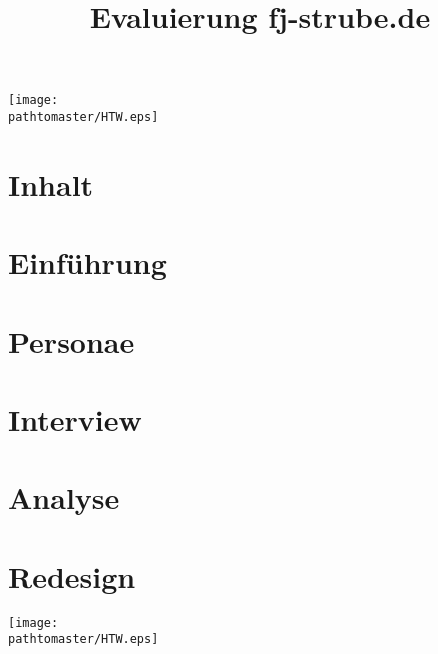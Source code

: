 \documentclass[11pt, 
]{beamer}
\author[]{Jan Brose\texorpdfstring{\strut\\}{, }
Simon Retsch\texorpdfstring{\strut\\}{, }
Ben Schönherr\texorpdfstring{\strut\\}{, }
Eric Schmidtgen\texorpdfstring{\strut\\}{, }
Falk-Jonatan Strube}
\title{Evaluierung fj-strube.de}
\gdef\pathtomaster{_LaTeX_master}
\begin{document}
\begin{frame}[plain]
\begin{center}
\texttt{[image: \\pathtomaster/HTW.eps]}
\end{center}
\maketitle
\end{frame}

\section*{Inhalt}
\begin{frame}
\tableofcontents
\end{frame}

\section{Einführung}


\section{Personae}


\section{Interview}


\section{Analyse}


\section{Redesign}


\begin{frame}[plain]
\begin{center}
\texttt{[image: \\pathtomaster/HTW.eps]}
\end{center}
\maketitle
\end{frame}
\end{document}
